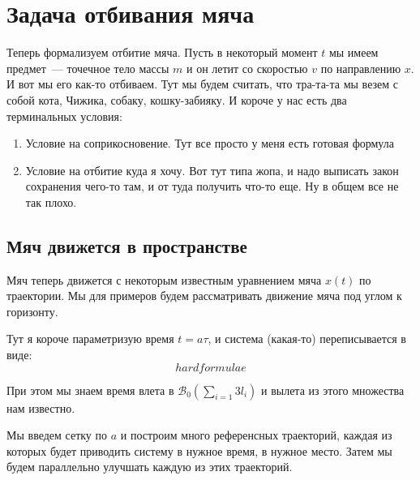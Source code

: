 \section{Задача отбивания мяча}

Теперь формализуем отбитие мяча. Пусть в некоторый момент $t$ мы имеем предмет~--- точечное тело массы $m$ и он летит со скоростью $v$ по направлению $x$.
И вот мы его как-то отбиваем. Тут мы будем считать, что тра-та-та мы везем с собой кота, Чижика, собаку, кошку-забияку. И короче у нас есть два терминальных условия:
\begin{enumerate}
    \item Условие на соприкосновение. Тут все просто у меня есть готовая формула
    \item Условие на отбитие куда я хочу. Вот тут типа жопа, и надо выписать закон сохранения чего-то там, и от туда получить что-то еще. Ну в общем все не так плохо.
\end{enumerate}

\subsection{Мяч движется в пространстве}

Мяч теперь движется с некоторым известным уравнением мяча $x(t)$ по траектории. Мы для примеров будем рассматривать движение мяча под углом к горизонту.

Тут я короче параметризую время $t = a\tau$, и система (какая-то) переписывается в виде:
$$
    hard formulae
$$

При этом мы знаем время влета в $\mathcal{B}_0(\sum_{i=1}{3}l_i)$ и вылета из этого множества нам известно.

Мы введем сетку по $a$ и построим много референсных траекторий, каждая из которых будет приводить систему в нужное время, в нужное место.
Затем мы будем параллельно улучшать каждую из этих траекторий.